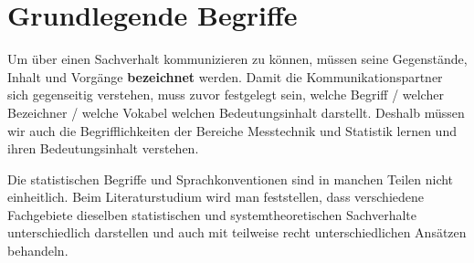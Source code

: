 
\section{Grundlegende Begriffe}
Um über einen Sachverhalt kommunizieren zu können, müssen seine Gegenstände, Inhalt und Vorgänge
\textbf{bezeichnet} werden. Damit die Kommunikationspartner sich gegenseitig verstehen, muss zuvor
festgelegt sein, welche Begriff / welcher Bezeichner / welche Vokabel welchen Bedeutungsinhalt darstellt.
Deshalb müssen wir auch die Begrifflichkeiten der Bereiche Messtechnik und Statistik lernen und ihren
Bedeutungsinhalt verstehen.

Die statistischen Begriffe und Sprachkonventionen sind in manchen Teilen nicht einheitlich.
Beim Literaturstudium wird man feststellen, dass verschiedene Fachgebiete dieselben statistischen und
systemtheoretischen Sachverhalte unterschiedlich darstellen und auch mit teilweise recht unterschiedlichen
Ansätzen behandeln.

